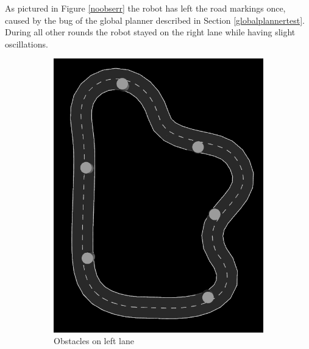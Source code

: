 As pictured in Figure \ref{noobserr} the robot has left the road markings once, caused by the bug of the global planner described in Section \ref{globalplannertest}. During all other rounds the robot stayed on the right lane while having slight oscillations.\\
\begin{figure}[H]
	\begin{subfigure}{.5\linewidth}
		\includegraphics[width=\textwidth]{Pictures/obstacle left final 2}
		\caption{Obstacles on left lane}
	\end{subfigure}	
	\begin{subfigure}{.5\linewidth}

\end{subfigure}
\end{figure}
